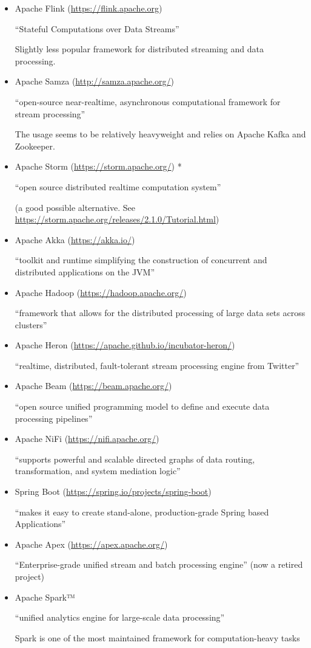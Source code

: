 \begin{itemize}
    \item Apache Flink (\url{https://flink.apache.org})

    \enquote{Stateful Computations over Data Streams}

    Slightly less popular framework for distributed streaming and data processing.
    \item Apache Samza (\url{http://samza.apache.org/})

    \enquote{open-source near-realtime, asynchronous computational framework for stream processing}

    The usage seems to be relatively heavyweight and relies on Apache Kafka and Zookeeper.
    \item Apache Storm (\url{https://storm.apache.org/}) *

    \enquote{open source distributed realtime computation system}

    (a good possible alternative.
    See \url{https://storm.apache.org/releases/2.1.0/Tutorial.html})
    \item Apache Akka (\url{https://akka.io/})

    \enquote{toolkit and runtime simplifying the construction of concurrent and distributed applications on the JVM}
    \item Apache Hadoop (\url{https://hadoop.apache.org/})

    \enquote{framework that allows for the distributed processing of large data sets across clusters}
    \item Apache Heron (\url{https://apache.github.io/incubator-heron/})

    \enquote{realtime, distributed, fault-tolerant stream processing engine from Twitter}
    \item Apache Beam (\url{https://beam.apache.org/})

    \enquote{open source unified programming model to define and execute data processing pipelines}
    \item Apache NiFi (\url{https://nifi.apache.org/})

    \enquote{supports powerful and scalable directed graphs of data routing, transformation, and system mediation logic}
    \item Spring Boot (\url{https://spring.io/projects/spring-boot})

    \enquote{makes it easy to create stand-alone, production-grade Spring based Applications}
    \item Apache Apex (\url{https://apex.apache.org/})

    \enquote{Enterprise-grade unified stream and batch processing engine} (now a retired project)
    \item Apache Spark™

    \enquote{unified analytics engine for large-scale data processing}

    Spark is one of the most maintained framework for computation-heavy tasks
\end{itemize}

